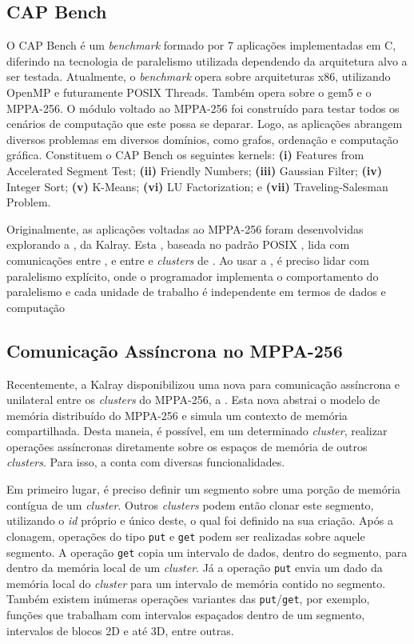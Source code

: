 \documentclass[a4paper,11pt]{article}
\newcommand{\mppa}{MPPA-256\xspace}
\newcommand{\capb}{CAP Bench\xspace}
\begin{document}
\subsection{\capb}
\label{subsec:capb}

O \capb é um \textit{benchmark} formado por 7 aplicações implementadas em C, diferindo na tecnologia de paralelismo utilizada dependendo da arquitetura alvo a ser testada. Atualmente, o \textit{benchmark} opera sobre arquiteturas x86, utilizando OpenMP e futuramente POSIX Threads. Também opera sobre o gem5 e o \mppa. O módulo voltado ao \mppa foi construído para testar todos os cenários de computação que este possa se deparar. Logo, as aplicações abrangem diversos problemas em diversos domínios, como grafos, ordenação e computação gráfica. Constituem o \capb os seguintes kernels: \textbf{(i)} Features from Accelerated Segment Test; \textbf{(ii)} Friendly Numbers; \textbf{(iii)} Gaussian Filter; \textbf{(iv)} Integer Sort; \textbf{(v)} K-Means; \textbf{(vi)} LU Factorization; e \textbf{(vii)} Traveling-Salesman Problem.

Originalmente, as aplicações voltadas ao \mppa foram desenvolvidas explorando a \api \ipc, da Kalray. Esta \api, baseada no padrão POSIX \ipc, lida com comunicações entre \ccs, e entre \ccs e \textit{clusters} de \io. Ao usar a \ipc, é preciso lidar com paralelismo explícito, onde o programador implementa o comportamento do paralelismo e cada unidade de trabalho é independente em termos de dados e computação \cite{Castro-Souza-CCPE:2016}


\subsection{Comunicação Assíncrona no \mppa}
\label{subsec:async}

Recentemente, a Kalray disponibilizou uma nova \api para comunicação assíncrona e unilateral entre os \textit{clusters} do \mppa, a \async. Esta nova \api abstrai o modelo de memória distribuído do \mppa e simula um contexto de memória compartilhada. Desta maneia, é possível, em um determinado \textit{cluster}, realizar operações assíncronas diretamente sobre os espaços de memória de outros \textit{clusters}. Para isso, a \api conta com diversas funcionalidades.

Em primeiro lugar, é preciso definir um segmento sobre uma porção de memória contígua de um \textit{cluster}. Outros \textit{clusters} podem então clonar este segmento, utilizando o \textit{id} próprio e único deste, o qual foi definido na sua criação. Após a clonagem, operações do tipo \texttt{put} e \texttt{get} podem ser realizadas sobre aquele segmento. A operação \texttt{get} copia um intervalo de dados, dentro do segmento, para dentro da memória local de um \textit{cluster}. Já a operação \texttt{put} envia um dado da memória local do \textit{cluster} para um intervalo de memória contido no segmento. Também existem inúmeras operações variantes das \texttt{put}/\texttt{get}, por exemplo, funções que trabalham com intervalos espaçados dentro de um segmento, intervalos de blocos 2D e até 3D, entre outras.
\end{document}
